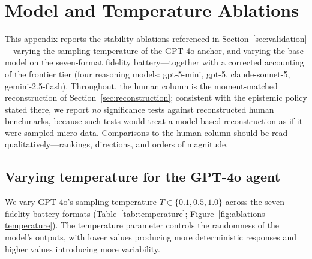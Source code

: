 \section{Model and Temperature Ablations}\label{app:ablations}

This appendix reports the stability ablations referenced in Section~\ref{sec:validation}---varying the sampling temperature of the GPT-4o anchor, and varying the base model on the seven-format fidelity battery---together with a corrected accounting of the frontier tier (four reasoning models: gpt-5-mini, gpt-5, claude-sonnet-5, gemini-2.5-flash). Throughout, the human column is the moment-matched reconstruction of Section~\ref{sec:reconstruction}; consistent with the epistemic policy stated there, we report \emph{no} significance tests against reconstructed human benchmarks, because such tests would treat a model-based reconstruction as if it were sampled micro-data. Comparisons to the human column should be read qualitatively---rankings, directions, and orders of magnitude. 

\subsection{Varying temperature for the GPT-4o agent}

We vary GPT-4o's sampling temperature $T \in \{0.1, 0.5, 1.0\}$ across the seven fidelity-battery formats (Table~\ref{tab:temperature}; Figure~\ref{fig:ablations-temperature}). The temperature parameter controls the randomness of the model's outputs, with lower values producing more deterministic responses and higher values introducing more variability.


